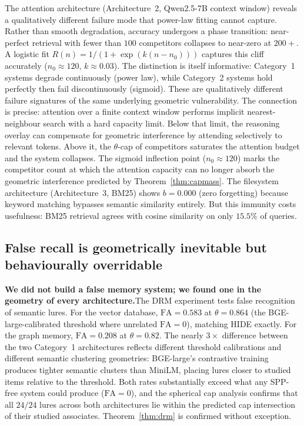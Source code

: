 \documentclass[11pt]{article}
\begin{document}
The attention architecture (Architecture~2, Qwen2.5-7B context window) reveals a qualitatively different failure mode that power-law fitting cannot capture. Rather than smooth degradation, accuracy undergoes a phase transition: near-perfect retrieval with fewer than $100$ competitors collapses to near-zero at $200+$. A logistic fit $R(n) = 1/(1 + \exp(k(n - n_0)))$ captures this cliff accurately ($n_0 \approx 120$, $k \approx 0.03$). The distinction is itself informative: Category~1 systems degrade continuously (power law), while Category~2 systems hold perfectly then fail discontinuously (sigmoid). These are qualitatively different failure signatures of the same underlying geometric vulnerability. The connection is precise: attention over a finite context window performs implicit nearest-neighbour search with a hard capacity limit. Below that limit, the reasoning overlay can compensate for geometric interference by attending selectively to relevant tokens. Above it, the $\theta$-cap of competitors saturates the attention budget and the system collapses. The sigmoid inflection point ($n_0 \approx 120$) marks the competitor count at which the attention capacity can no longer absorb the geometric interference predicted by Theorem~\ref{thm:capmass}. The filesystem architecture (Architecture~3, BM25) shows $b = 0.000$ (zero forgetting) because keyword matching bypasses semantic similarity entirely. But this immunity costs usefulness: BM25 retrieval agrees with cosine similarity on only $15.5\%$ of queries.

\subsection*{False recall is geometrically inevitable but behaviourally overridable}

\noindent\textbf{We did not build a false memory system; we found one in the geometry of every architecture.}\quad The DRM experiment\cite{roediger1995} tests false recognition of semantic lures. For the vector database, $\text{FA} = 0.583$ at $\theta = 0.864$ (the BGE-large-calibrated threshold where unrelated $\text{FA} = 0$), matching HIDE exactly. For the graph memory, $\text{FA} = 0.208$ at $\theta = 0.82$. The nearly $3\times$ difference between the two Category~1 architectures reflects different threshold calibrations and different semantic clustering geometries: BGE-large's contrastive training produces tighter semantic clusters than MiniLM, placing lures closer to studied items relative to the threshold. Both rates substantially exceed what any SPP-free system could produce ($\text{FA} = 0$), and the spherical cap analysis confirms that all $24/24$ lures across both architectures lie within the predicted cap intersection of their studied associates. Theorem~\ref{thm:drm} is confirmed without exception.
\end{document}

